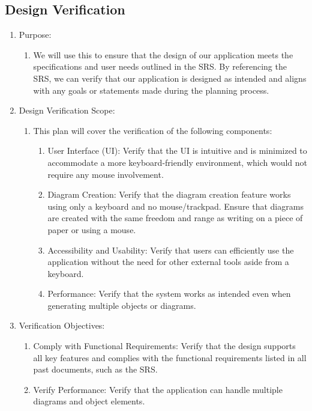 \documentclass[12pt, titlepage]{article}
\begin{document}
\subsection{Design Verification}

\begin{enumerate}
\item Purpose:
\begin{enumerate}
\item We will use this to ensure that the design of our application
meets the specifications and user needs outlined in the SRS.
By referencing the SRS, we can verify that our application
is designed as intended and aligns with any goals or statements
made during the planning process.
\end{enumerate}

\item Design Verification Scope:
\begin{enumerate}
\item This plan will cover the verification of the following components:
\begin{enumerate}
\item User Interface (UI): Verify that the UI is intuitive
and is minimized to accommodate a more keyboard-friendly
environment, which would not require any mouse involvement.
\item Diagram Creation: Verify that the diagram creation
feature works using only a keyboard and no mouse/trackpad.
Ensure that diagrams are created with the same freedom
and range as writing on a piece of paper or using a mouse.
\item Accessibility and Usability: Verify that users
can efficiently use the application without the need
for other external tools aside from a keyboard.
\item Performance: Verify that the system works as
intended even when generating multiple objects or diagrams.
\end{enumerate}
\end{enumerate}

\item Verification Objectives:
\begin{enumerate}
\item Comply with Functional Requirements: Verify that
the design supports all key features and complies with
the functional requirements listed in all past
documents, such as the SRS.
\item Verify Performance: Verify that the
application can handle multiple diagrams
and object elements.
\end{enumerate}


\end{enumerate}
\end{document}
